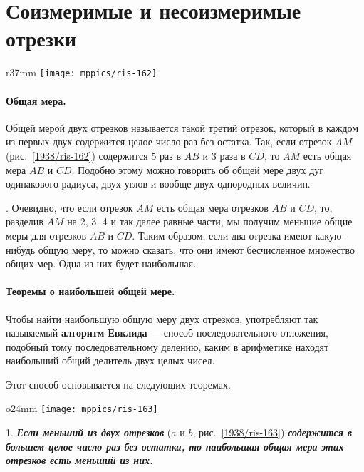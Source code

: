 \section{Соизмеримые и несоизмеримые отрезки}

\begin{wrapfigure}{r}{37mm}
\centering
\texttt{[image: mppics/ris-162]}
\caption{}\label{1938/ris-162}
\end{wrapfigure}

\paragraph{Общая мера.}\label{1938/145}
Общей мерой двух отрезков называется такой третий отрезок, который в каждом из первых двух содержится целое число раз без остатка.
Так, если отрезок $AM$ (рис.~\ref{1938/ris-162}) содержится 5 раз в $AB$ и 3 раза в $CD$, то $AM$ есть общая мера $AB$ и $CD$.
Подобно этому можно говорить об общей мере двух дуг одинакового радиуса, двух углов и вообще двух однородных величин.

\smallskip
{}.
Очевидно, что если отрезок $AM$ есть общая мера
отрезков $AB$ и $CD$, то, разделив $AM$ на 2, 3, 4 и так далее равные
части, мы получим меньшие общие меры для отрезков $AB$ и $CD$.
Таким образом, если два отрезка имеют какую-нибудь общую меру, то можно сказать, что они имеют бесчисленное множество общих мер.
Одна из них будет наибольшая.

\paragraph{Теоремы о наибольшей общей мере.}\label{1938/146}
Чтобы найти наибольшую общую меру двух отрезков, употребляют так называемый \textbf{алгоритм Евклида} — способ последовательного отложения, подобный тому последовательному делению, каким в арифметике находят наибольший общий делитель двух целых чисел. 

Этот способ основывается на следующих теоремах.

\begin{wrapfigure}{o}{24mm}
\centering
\texttt{[image: mppics/ris-163]}
\caption{}\label{1938/ris-163}
\end{wrapfigure}

1.
\textbf{\emph{Если меньший из двух отрезков}} ($a$ и $b$, рис.~\ref{1938/ris-163}) \textbf{\emph{содержится в большем целое число раз без остатка, то наибольшая общая мера этих отрезков есть меньший из них.}}

